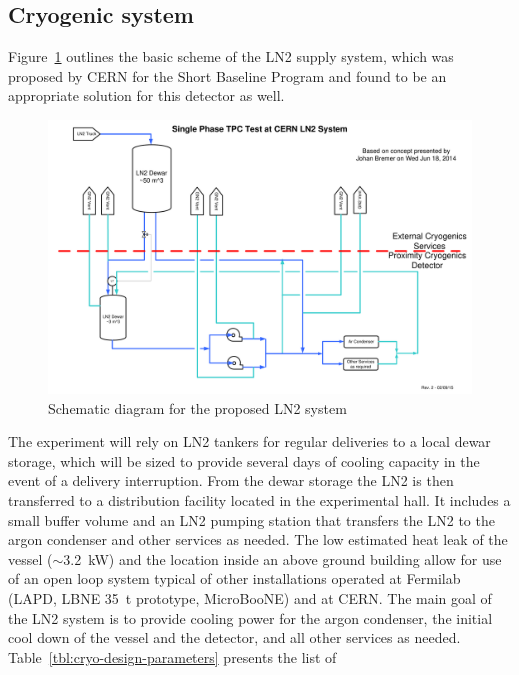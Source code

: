 \subsection{Cryogenic system}

Figure~\ref{fig:proposed-LN2-system} outlines the basic scheme of the LN2 supply system, which was 
proposed by CERN for the Short Baseline Program and found to be an appropriate solution for this 
detector as well. 
%
\begin{figure}[htb]
\begin{center}
\includegraphics[width=.95\textwidth]{figures/proposed-LN2-system} 
\caption[Schematic diagram for the proposed LN2 system.]{\label{fig:proposed-LN2-system}Schematic diagram for the proposed LN2 system}
\end{center}
\end{figure}
%
The experiment will rely on LN2 tankers for regular deliveries to a local dewar storage, 
which will be sized to provide several days of cooling capacity in the event of a delivery interruption. 
From the dewar storage the LN2 is then transferred to a distribution facility located in the experimental 
hall. It includes a small buffer volume and an LN2 pumping station that transfers the LN2 to the argon 
condenser and other services as needed. The low estimated heat leak of the vessel ($\sim$3.2~kW) and the 
location inside an above ground building allow for use of an open loop system typical of other 
installations operated at Fermilab (LAPD, LBNE 35~t prototype, MicroBooNE) and at CERN. 
The main goal of the LN2 system is to provide cooling power for the argon condenser, the initial cool down of 
the vessel and the detector, and all other services as needed.
%
 Table~\ref{tbl:cryo-design-parameters} presents the list of 
